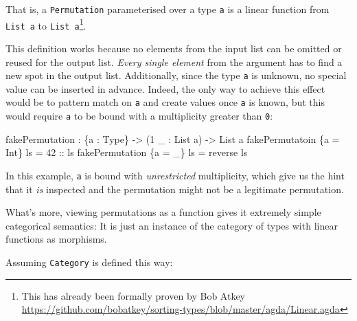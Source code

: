 \documentclass[
]{article}
\newenvironment{Shaded}{}{}
\newcommand{\DataTypeTok}[1]{\textcolor[rgb]{0.56,0.13,0.00}{#1}}
\newcommand{\DecValTok}[1]{\textcolor[rgb]{0.25,0.63,0.44}{#1}}
\newcommand{\FunctionTok}[1]{\textcolor[rgb]{0.02,0.16,0.49}{#1}}
\newcommand{\NormalTok}[1]{#1}
\newcommand{\OperatorTok}[1]{\textcolor[rgb]{0.40,0.40,0.40}{#1}}
\newcommand{\OtherTok}[1]{\textcolor[rgb]{0.00,0.44,0.13}{#1}}
\begin{document}
That is, a \texttt{Permutation} parameterised over a type \texttt{a} is
a linear function from \texttt{List\ a} to \texttt{List\ a}\footnote{This
  has already been formally proven by Bob Atkey
  \url{https://github.com/bobatkey/sorting-types/blob/master/agda/Linear.agda}}.

This definition works because no elements from the input list can be
omitted or reused for the output list. \emph{Every single element} from
the argument has to find a new spot in the output list. Additionally,
since the type \texttt{a} is unknown, no special value can be inserted
in advance. Indeed, the only way to achieve this effect would be to
pattern match on \texttt{a} and create values once \texttt{a} is known,
but this would require \texttt{a} to be bound with a multiplicity
greater than \texttt{0}:

\begin{Shaded}
\begin{Highlighting}[]
\NormalTok{fakePermutation }\OperatorTok{:}\NormalTok{ \{a }\OperatorTok{:} \DataTypeTok{Type}\NormalTok{\} }\OtherTok{{-}\textgreater{}}\NormalTok{ (}\DecValTok{1}\NormalTok{ \_ }\OperatorTok{:} \DataTypeTok{List}\NormalTok{ a) }\OtherTok{{-}\textgreater{}} \DataTypeTok{List}\NormalTok{ a}
\NormalTok{fakePermutatoin \{a }\OtherTok{=} \DataTypeTok{Int}\NormalTok{\} ls }\OtherTok{=} \DecValTok{42}\OtherTok{ ::}\NormalTok{ ls}
\NormalTok{fakePermutation \{a }\OtherTok{=}\NormalTok{ \_\} ls }\OtherTok{=} \FunctionTok{reverse}\NormalTok{ ls}
\end{Highlighting}
\end{Shaded}

In this example, \texttt{a} is bound with \emph{unrestricted}
multiplicity, which give us the hint that it \emph{is} inspected and the
permutation might not be a legitimate permutation.

What's more, viewing permutations as a function gives it extremely
simple categorical semantics: It is just an instance of the category of
types with linear functions as morphisms.

Assuming \texttt{Category} is defined this way:
\end{document}
